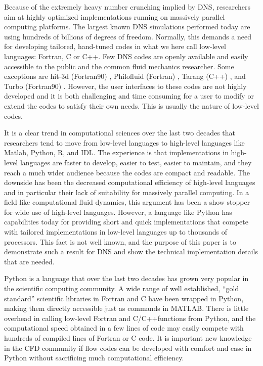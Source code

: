 \documentclass[11pt, oneside]{article}
\begin{document}
Because of the extremely heavy number crunching implied by DNS,
researchers aim at highly optimized implementations running on
massively parallel computing platforms. The largest known DNS
simulations performed today are using hundreds of billions of degrees
of freedom. Normally, this demands a need for developing tailored, hand-tuned
codes in what we here call low-level languages: Fortran, C or C++. Few
DNS codes are openly available and easily accessible to the public and
the common fluid mechanics researcher. Some exceptions are hit-3d
(Fortran90) \cite{hit-3d}, Philofluid (Fortran) \cite{philofluid},
Tarang (C++) \cite{tarang}, and Turbo (Fortran90)
\cite{turbo}. However, the user interfaces to these codes are not highly 
developed and it is both challenging and time consuming for a user to 
modify or extend the codes to satisfy their own needs. This is usually 
the nature of low-level codes.

It is a clear trend in computational sciences over the last two decades
that researchers tend to move from low-level languages to high-level languages
like Matlab, Python, R, and IDL. The experience is that implementations
in high-level languages are faster to develop, easier to test,
easier to maintain, and they
reach a much wider audience because the codes are compact and readable.
The downside has been the decreased computational
efficiency of high-level languages and in particular their lack of
suitability for massively parallel computing. In a field like computational
fluid dynamics, this argument has been a show stopper for wide use
of high-level languages. However, a language like Python has capabilities
today for providing short and quick implementations that compete with
tailored implementations in low-level languages up to thousands of processors.
This fact is not well known, and the purpose of this paper is to
demonstrate such a result for DNS and show the technical implementation
details that are needed.


Python is a language that over the last two decades has grown very popular in the scientific computing community. A wide range of well established, ``gold standard'' scientific libraries in Fortran and C have been wrapped in Python, making them directly accessible just as commands in MATLAB. There is little overhead in calling low-level Fortran and C/C++functions from Python, and the computational speed obtained in a few lines of code may easily compete with hundreds of compiled lines of Fortran or C code. It is important new knowledge in the CFD community if flow codes can be developed with comfort and ease in Python without sacrificing much computational efficiency.
\end{document}
